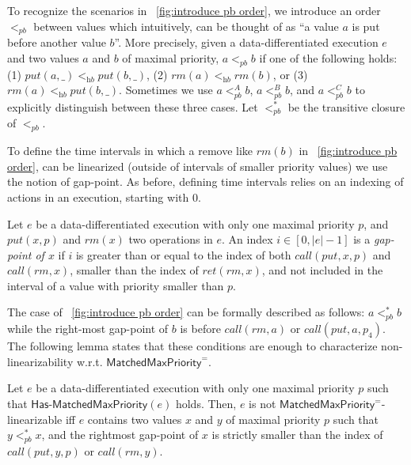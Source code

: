 \documentclass[a4paper,UKenglish]{lipics-v2016}
\begin{document}
To recognize the scenarios in \figurename~\ref{fig:introduce pb order}, we introduce an order $<_{\textit{pb}}$ between values which intuitively, can be thought of as ``a value $a$ is put before another value $b$''. 
More precisely, given a data-differentiated execution $e$ and two values $a$ and $b$ of maximal priority, $a <_{\textit{pb}} b$ if one of the following holds: (1) $\textit{put}(a,\_) <_{\textit{hb}} \textit{put}(b,\_)$, (2) $\textit{rm}(a) <_{\textit{hb}} \textit{rm}(b)$, or (3) $\textit{rm}(a) <_{\textit{hb}} \textit{put}(b,\_)$. Sometimes we use $a <_{\textit{pb}}^A b$, $a <_{\textit{pb}}^B b$, and $a <_{\textit{pb}}^C b$ to explicitly distinguish between these three cases. Let $<_{\textit{pb}}^*$ be the transitive closure of $<_{\textit{pb}}$.

To define the time intervals in which a remove like $\textit{rm}(b)$ in \figurename~\ref{fig:introduce pb order}, can be linearized (outside of intervals of smaller priority values) we use the notion of gap-point. As before, defining time intervals relies on an indexing of actions in an execution, starting with 0.

\begin{definition}\label{def:gap-point for matched put and rm operations}
Let $e$ be a data-differentiated execution with only one maximal priority $p$, and $\textit{put}(x,p)$ and $\textit{rm}(x)$ two operations in $e$. An index $i\in [0,|e|-1]$ is a \emph{gap-point of $x$} if $i$ is greater than or equal to the index of both $\textit{call}(\textit{put},x,p)$ and $\textit{call}(\textit{rm},x)$, smaller than the index of $\textit{ret}(\textit{rm},x)$, and not included in the interval of a value with priority smaller than $p$.
\end{definition}

The case of \figurename~\ref{fig:introduce pb order} can be formally described as follows: $a <_{\textit{pb}}^* b$ while the right-most gap-point of $b$ is before $\textit{call}(\textit{rm},a)$ or $\textit{call}(\textit{put},a,p_4)$. The following lemma states that these conditions are enough to characterize non-linearizability w.r.t. $\mathsf{MatchedMaxPriority}^{=}$. 

\begin{lemma}
\label{lemma:EPQ1Equal as pb order and gap-point}
Let $e$ be a data-differentiated execution with only one maximal priority $p$ such that $\mathsf{Has\text{-}MatchedMaxPriority}(e)$ holds.
Then, $e$ is not $\mathsf{MatchedMaxPriority}^{=}$-linearizable iff $e$ contains two values $x$ and $y$ of maximal priority $p$ such that $y <_{\textit{pb}}^* x$, and the rightmost gap-point of $x$ is strictly smaller than the index of $\textit{call}(\textit{put},y,p)$ or $\textit{call}(\textit{rm},y)$.
\end{lemma}
\end{document}
